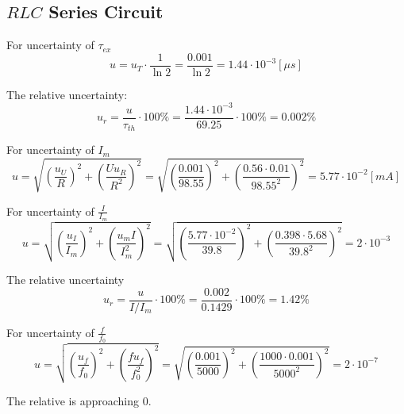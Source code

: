 \documentclass[12pt]{article}
\begin{document}
\subsection{$RLC$ Series Circuit}
For uncertainty of $\tau_{ex}$
$$u=u_T\cdot\frac{1}{\ln2}=\frac{0.001}{\ln2}=1.44\cdot10^{-3}[\mu s]$$
\par The relative uncertainty:
$$u_r=\frac{u}{\tau_{th}}\cdot100\%=\frac{1.44\cdot10^{-3}}{69.25}\cdot100\%=0.002\%$$
\par For uncertainty of $I_m$
$$u=\sqrt{(\frac{u_U}{R})^2+(\frac{Uu_R}{R^2})^2}=\sqrt{(\frac{0.001}{98.55})^2+(\frac{0.56\cdot0.01}{98.55^2})^2}=5.77\cdot10^{-2}[mA]$$
\par For uncertainty of $\frac{I}{I_m}$
$$u=\sqrt{(\frac{u_I}{I_m})^2+(\frac{u_mI}{I_m^2})^2}=\sqrt{(\frac{5.77\cdot10^{-2}}{39.8})^2+(\frac{0.398\cdot5.68}{39.8^2})^2}=2\cdot10^{-3}$$
\par The relative uncertainty 
$$u_r=\frac{u}{I/I_m}\cdot100\%=\frac{0.002}{0.1429}\cdot100\%=1.42\%$$
\par For uncertainty of $\frac{f}{f_0}$
$$u=\sqrt{(\frac{u_f}{f_0})^2+(\frac{fu_f}{f_0^2})^2}=\sqrt{(\frac{0.001}{5000})^2+(\frac{1000\cdot0.001}{5000^2})^2}=2\cdot10^{-7}$$
\par The relative is approaching 0.
\end{document}
